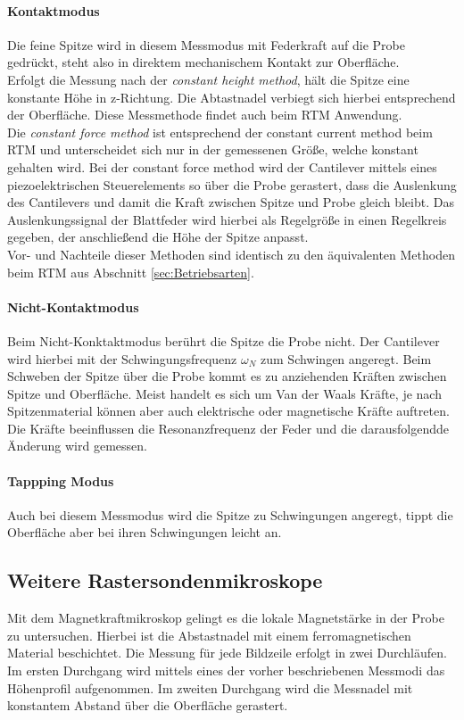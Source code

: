 \documentclass[a4paper,twoside,final]{article}
\begin{document}
\paragraph{Kontaktmodus}
Die feine Spitze wird in diesem Messmodus mit Federkraft auf die Probe gedrückt, steht also in direktem mechanischem Kontakt zur Oberfläche. \\
Erfolgt die Messung nach der \textit{constant height method}, hält die Spitze eine konstante Höhe in z-Richtung. Die Abtastnadel verbiegt sich hierbei entsprechend der Oberfläche. Diese Messmethode findet auch beim RTM Anwendung. \\
Die \textit{constant force method} ist entsprechend der constant current method beim RTM und unterscheidet sich nur in der gemessenen Größe, welche konstant gehalten wird. Bei der constant force method wird der Cantilever mittels eines piezoelektrischen Steuerelements so über die Probe gerastert, dass die Auslenkung des Cantilevers und damit die Kraft zwischen Spitze und Probe gleich bleibt. Das Auslenkungssignal der Blattfeder wird hierbei als Regelgröße in einen Regelkreis gegeben, der anschließend die Höhe der Spitze anpasst.\\
Vor- und Nachteile dieser Methoden sind identisch zu den äquivalenten Methoden beim RTM aus Abschnitt \ref{sec:Betriebsarten}.

\paragraph{Nicht-Kontaktmodus}
Beim Nicht-Konktaktmodus berührt die Spitze die Probe nicht. Der Cantilever wird hierbei mit der Schwingungsfrequenz $\omega_N$ zum Schwingen angeregt. Beim Schweben der Spitze über die Probe kommt es zu anziehenden Kräften zwischen Spitze und Oberfläche. Meist handelt es sich um Van der Waals Kräfte, je nach Spitzenmaterial können aber auch elektrische oder magnetische Kräfte auftreten. Die Kräfte beeinflussen die Resonanzfrequenz der Feder und die darausfolgendde Änderung wird gemessen.

\paragraph{Tappping Modus}
Auch bei diesem Messmodus wird die Spitze zu Schwingungen angeregt, tippt die Oberfläche aber bei ihren Schwingungen leicht an.

\subsection{Weitere Rastersondenmikroskope}
Mit dem Magnetkraftmikroskop gelingt es die lokale Magnetstärke in der Probe zu untersuchen. Hierbei ist die Abstastnadel mit einem ferromagnetischen Material beschichtet. Die Messung für jede Bildzeile erfolgt in zwei Durchläufen. Im ersten Durchgang wird mittels eines der vorher beschriebenen Messmodi das Höhenprofil aufgenommen. Im zweiten Durchgang wird die Messnadel mit konstantem Abstand über die Oberfläche gerastert.\\
\end{document}
